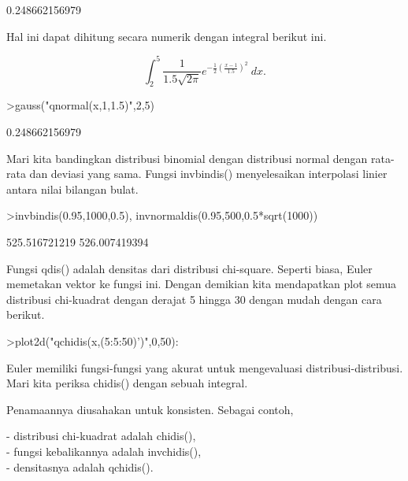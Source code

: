 \documentclass{article}
\begin{document}
\begin{eulernotebook}
\begin{euleroutput}
  0.248662156979
\end{euleroutput}
\begin{eulercomment}
Hal ini dapat dihitung secara numerik dengan integral berikut ini.\\
\end{eulercomment}
\begin{eulerformula}
\[
\int_2^5 \frac{1}{1.5\sqrt{2\pi}}e^{-\frac{1}{2}(\frac{x-1}{1.5})^2}\ dx.
\]
\end{eulerformula}
\begin{eulerprompt}
>gauss("qnormal(x,1,1.5)",2,5)
\end{eulerprompt}
\begin{euleroutput}
  0.248662156979
\end{euleroutput}
\begin{eulercomment}
Mari kita bandingkan distribusi binomial dengan distribusi normal
dengan rata-rata dan deviasi yang sama. Fungsi invbindis()
menyelesaikan interpolasi linier antara nilai bilangan bulat.
\end{eulercomment}
\begin{eulerprompt}
>invbindis(0.95,1000,0.5), invnormaldis(0.95,500,0.5*sqrt(1000))
\end{eulerprompt}
\begin{euleroutput}
  525.516721219
  526.007419394
\end{euleroutput}
\begin{eulercomment}
Fungsi qdis() adalah densitas dari distribusi chi-square. Seperti
biasa, Euler memetakan vektor ke fungsi ini. Dengan demikian kita
mendapatkan plot semua distribusi chi-kuadrat dengan derajat 5 hingga
30 dengan mudah dengan cara berikut.
\end{eulercomment}
\begin{eulerprompt}
>plot2d("qchidis(x,(5:5:50)')",0,50):
\end{eulerprompt}
\begin{eulercomment}
Euler memiliki fungsi-fungsi yang akurat untuk mengevaluasi
distribusi-distribusi. Mari kita periksa chidis() dengan sebuah
integral.

Penamaannya diusahakan untuk konsisten. Sebagai contoh,

- distribusi chi-kuadrat adalah chidis(),\\
- fungsi kebalikannya adalah invchidis(),\\
- densitasnya adalah qchidis().


\end{eulercomment}
\end{eulernotebook}
\end{document}
